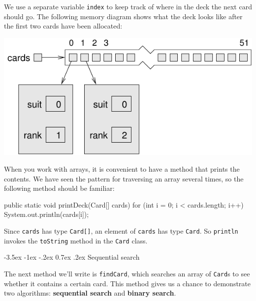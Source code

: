 \documentclass[12pt]{book}
\makeatletter
\theoremstyle{exercise}
\newcommand{\java}[1]{\verb"#1"}
\renewcommand{\section}{\@startsection{section}{1}{\z@}%
    {-3.5ex \@plus -1ex \@minus -.2ex}%
    {0.7ex \@plus.2ex}%
    {\normalfont\Large\bfseries}}
\newcommand{\java}[1]{\lstinline{#1}} %
\makeatother
\begin{document}

We use a separate variable \java{index} to keep track of where in the deck the next card should go.
The following memory diagram shows what the deck looks like after the first two cards have been allocated:

\begin{center}
\includegraphics{figs/cardarray2.pdf}
\end{center}


\label{printdeck}


When you work with arrays, it is convenient to have a method that prints the contents.
We have seen the pattern for traversing an array several times, so the following method should be familiar:

\begin{code}
    public static void printDeck(Card[] cards) {
        for (int i = 0; i < cards.length; i++) {
            System.out.println(cards[i]);
        }
    }
\end{code}

Since \java{cards} has type \java{Card[]}, an element of \java{cards} has type \java{Card}.
So \java{println} invokes the \java{toString} method in the \java{Card} class.


\section{Sequential search}
\label{findcard}


The next method we'll write is \java{findCard}, which searches an array of \java{Card}s to see whether it contains a certain card.
This method gives us a chance to demonstrate two algorithms: {\bf sequential search} and {\bf binary search}.
\end{document}
